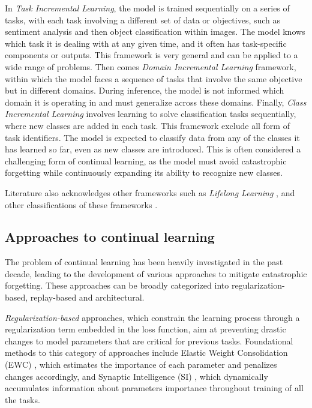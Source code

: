 \documentclass[11pt]{article}
\begin{document}
\vspace{2mm}
\noindent
In \textit{Task Incremental Learning}, the model is trained sequentially on a series of tasks, with each task involving a different set of data or objectives, such as sentiment analysis and then object classification within images. The model knows which task it is dealing with at any given time, and it often has task-specific components or outputs. This framework is very general and can be applied to a wide range of problems. Then comes \textit{Domain Incremental Learning} framework, within which the model faces a sequence of tasks that involve the same objective but in different domains. During inference, the model is not informed which domain it is operating in and must generalize across these domains. Finally, \textit{Class Incremental Learning} involves learning to solve classification tasks sequentially, where new classes are added in each task. This framework exclude all form of task identifiers. The model is expected to classify data from any of the classes it has learned so far, even as new classes are introduced. This is often considered a challenging form of continual learning, as the model must avoid catastrophic forgetting while continuously expanding its ability to recognize new classes.

\vspace{2mm}
\noindent
Literature also acknowledges other frameworks such as \textit{Lifelong Learning} \cite{review2}\cite{review3}\cite{frameworks_3_lifelong_DEN}, and other classifications of these frameworks \cite{review1}\cite{review4}.


\subsection{Approaches to continual learning}


The problem of continual learning has been heavily investigated in the past decade, leading to the development of various approaches to mitigate catastrophic forgetting. These approaches can be broadly categorized into regularization-based, replay-based and architectural.

\vspace{2mm}
\noindent
\textit{Regularization-based} approaches, which constrain the learning process through a regularization term embedded in the loss function, aim at preventing drastic changes to model parameters that are critical for previous tasks. Foundational methods to this category of approaches include Elastic Weight Consolidation (EWC) \cite{EWC_0}\cite{EWC_nuts_and_bolts}, which estimates the importance of each parameter and penalizes changes accordingly, and Synaptic Intelligence (SI) \cite{SI}, which dynamically accumulates information about parameters importance throughout training of all the tasks.
\end{document}
